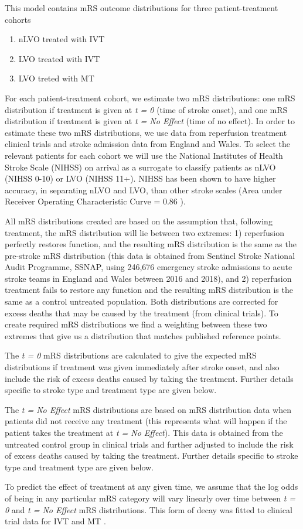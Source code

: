 This model contains mRS outcome distributions for three patient-treatment cohorts

\begin{enumerate}
    \item nLVO treated with IVT
    \item LVO treated with IVT
    \item LVO treted with MT
\end{enumerate}

For each patient-treatment cohort, we estimate two mRS distributions: one mRS distribution if treatment is given at \emph{t = 0} (time of stroke onset), and one mRS distribution if treatment is given at \emph{t = No Effect} (time of no effect). In order to estimate these two mRS distributions, we use data from reperfusion treatment clinical trials and stroke admission data from England and Wales. To select the relevant patients for each cohort we will use the National Institutes of Health Stroke Scale (NIHSS) on arrival as a surrogate to classify patients as nLVO (NIHSS 0-10) or LVO (NIHSS 11+). NIHSS has been shown to have higher accuracy, in separating nLVO and LVO, than other stroke scales (Area under Receiver Operating Characteristic Curve = 0.86 \cite{duvekot_comparison_2021}).

All mRS distributions created are based on the assumption that, following treatment, the mRS distribution will lie between two extremes: 1) reperfusion perfectly restores function, and the resulting mRS distribution is the same as the pre-stroke mRS distribution (this data is obtained from Sentinel Stroke National Audit Programme, SSNAP, using 246,676 emergency stroke admissions to acute stroke teams in England and Wales between 2016 and 2018), and 2) reperfusion treatment fails to restore any function and the resulting mRS distribution is the same as a control untreated population. Both distributions are corrected for excess deaths that may be caused by the treatment (from clinical trials). To create required mRS distributions we find a weighting between these two extremes that give us a distribution that matches published reference points.

The \emph{t = 0} mRS distributions are calculated to give the expected mRS distributions if treatment was given immediately after stroke onset, and also include the risk of excess deaths caused by taking the treatment. Further details specific to stroke type and treatment type are given below.

The \emph{t = No Effect} mRS distributions are based on mRS distribution data when patients did not receive any treatment (this represents what will happen if the patient takes the treatment at \emph{t = No Effect}). This data is obtained from the untreated control group in clinical trials and further adjusted to include the risk of excess deaths caused by taking the treatment. Further details specific to stroke type and treatment type are given below.

To predict the effect of treatment at any given time, we assume that the log odds of being in any particular mRS category will vary linearly over time between \emph{t = 0} and \emph{t = No Effect} mRS distributions. This form of decay was fitted to clinical trial data for IVT \cite{emberson_effect_2014} and MT \cite{fransen_time_2016}. 
